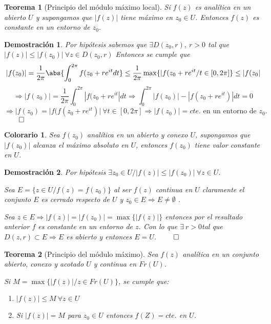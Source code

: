 \documentclass[12pt]{book}
\newtheorem{theorem}{Teorema}[chapter]
\newtheorem*{dem}{Demostración}
\newtheorem{col}{Colorario}[chapter]
\begin{document}
\begin{theorem}[Principio del módulo máximo local]
Si $f(z)$ es analítica en un abierto $U$ y supongamos que $|f(z)|$ tiene máximo en $z_0\in U$. Entonces $f(z)$ es constante en un entorno de $z_0$.
\end{theorem}

\begin{dem}
Por hipótesis sabemos que $\exists D(z_0,r),\ r>0$ tal que $|f(z)| \leq |f(z_0)|\ \forall z \in D(z_0,r)$ Entonces se cumple que
$$
|f(z_0)| = \frac{1}{2\pi}\abs{\int_0^{2\pi}f(z_0+re^{it}dt} \leq \frac{1}{2\pi}\max\{|f(z_0+re^{it}/t\in [0,2\pi]\}\leq |f(z_0|
$$
$$
\Rightarrow |f(z_0)| = \frac{1}{2\pi}\int_0^{2\pi}|f(z_0+re^{it}|dt \Rightarrow \int_0^{2\pi} |f(z_0)|-|f(z_0+re^{it})|dt = 0
$$
$$
\Rightarrow |f(z_0) = |f(f(z_0+re^{it})|\ \forall t\in[0,2\pi]\Rightarrow |f(z_0)|= cte. \text{ en un entorno de } z_0.
$$$\qed$
\end{dem}

\begin{col}
Sea $f(z_0)$ analítica en un abierto y conexo $U$, supongamos que $|f(z_0)|$ alcanza el máximo absoluto en $U$, entonces $f(z_0)$ tiene valor constante en $U$.
\end{col}
\begin{dem}
Por hipótesis $\exists z_0 \in U / |f(z)|\leq |f(z_0)| \ \forall z \in U$.

Sea $E = \{z\in U / f(z) = f(z_0)\}$ al ser $f(z)$ continua en $U$ claramente el conjunto $E$ es cerrado respecto de $U$  y $z_0\in E \Rightarrow E \neq \emptyset$ .

Sea $z\in E \Rightarrow |f(z)| = |f(z_0)| = \max\{|f(z)|\}$ entonces por el resultado anterior $f$ es constante en un entorno de $z$. Con lo que $\exists\  r>0 $tal que $D(z,r)\subset E \Rightarrow E$ es abierto y entonces $E=U$. $\qed$
\end{dem}

\begin{theorem}[Principio del módulo máximo]
Sea $f(z)$ analítica en un conjunto abierto, conexo y acotado $U$ y continua en $Fr(U)$. 

Si $M =\max \{|f(z)|/ z\in Fr(U)\}$, se cumple que:

\begin{enumerate}
\item $|f(z)|\leq M \ \forall z \in U$
\item Si $|f(z)| = M$ para $z_0 \in U$ entonces $f(Z) = cte.$ en $U$.
\end{enumerate}
\end{theorem}
\end{document}
